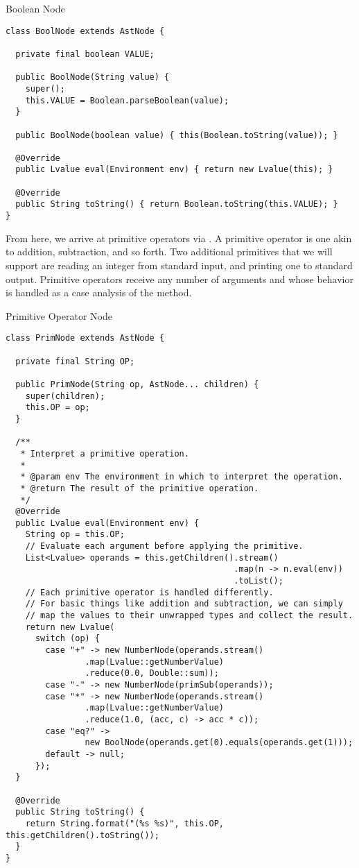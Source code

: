 \begin{cl}{Boolean Node}
\begin{lstlisting}[language=MyJava]
class BoolNode extends AstNode {

  private final boolean VALUE;

  public BoolNode(String value) {
    super();
    this.VALUE = Boolean.parseBoolean(value);
  }

  public BoolNode(boolean value) { this(Boolean.toString(value)); }

  @Override
  public Lvalue eval(Environment env) { return new Lvalue(this); }

  @Override
  public String toString() { return Boolean.toString(this.VALUE); }
}
\end{lstlisting}
\end{cl}

From here, we arrive at primitive operators via . A primitive operator is one akin to addition, subtraction, and so forth. Two additional primitives that we will support are reading an integer from standard input, and printing one to standard output. Primitive operators receive any number of arguments and whose behavior is handled as a case analysis of the  method. 

\begin{cl}{Primitive Operator Node}
\begin{lstlisting}[language=MyJava]
class PrimNode extends AstNode {

  private final String OP;

  public PrimNode(String op, AstNode... children) {
    super(children);
    this.OP = op;
  }

  /**
   * Interpret a primitive operation.
   *
   * @param env The environment in which to interpret the operation.
   * @return The result of the primitive operation.
   */
  @Override
  public Lvalue eval(Environment env) {
    String op = this.OP;
    // Evaluate each argument before applying the primitive.
    List<Lvalue> operands = this.getChildren().stream()
                                              .map(n -> n.eval(env))
                                              .toList();
    // Each primitive operator is handled differently.
    // For basic things like addition and subtraction, we can simply
    // map the values to their unwrapped types and collect the result.
    return new Lvalue(
      switch (op) {
        case "+" -> new NumberNode(operands.stream()
                .map(Lvalue::getNumberValue)
                .reduce(0.0, Double::sum));
        case "-" -> new NumberNode(primSub(operands));
        case "*" -> new NumberNode(operands.stream()
                .map(Lvalue::getNumberValue)
                .reduce(1.0, (acc, c) -> acc * c));
        case "eq?" ->
                new BoolNode(operands.get(0).equals(operands.get(1)));
        default -> null;
      });
  }

  @Override
  public String toString() {
    return String.format("(%s %s)", this.OP, this.getChildren().toString());
  }
}
\end{lstlisting}
\end{cl}

